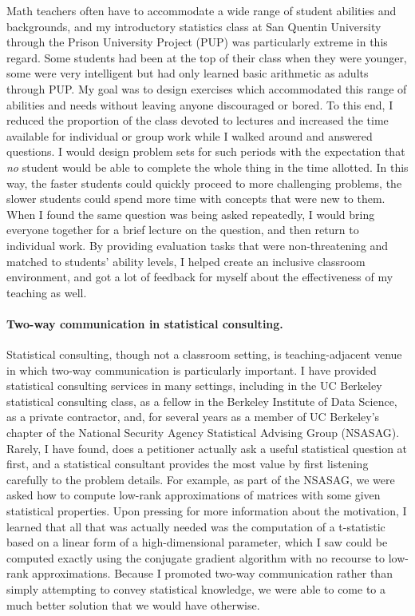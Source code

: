 Math teachers often have to accommodate a wide range of student abilities and
backgrounds, and my introductory statistics class at San Quentin University
through the Prison University Project (PUP) was particularly extreme in this
regard.  Some students had been at the top of their class when they were
younger, some were very intelligent but had only learned basic arithmetic as
adults through PUP.  My goal was to design exercises which accommodated this
range of abilities and needs without leaving anyone discouraged or bored. To
this end, I reduced the proportion of the class devoted to lectures and
increased the time available for individual or group work while I walked around
and answered questions.  I would design problem sets for such periods with the
expectation that \emph{no} student would be able to complete the whole thing in
the time allotted. In this way, the faster students could quickly proceed to
more challenging problems, the slower students could spend more time with
concepts that were new to them. When I found the same question was being asked
repeatedly, I would bring everyone together for a brief lecture on the question,
and then return to individual work.  By providing evaluation tasks that were
non-threatening and matched to students' ability levels, I helped create an
inclusive classroom environment, and got a lot of feedback for myself about the
effectiveness of my teaching as well.

\paragraph{Two-way communication in statistical consulting.}

Statistical consulting, though not a classroom setting, is teaching-adjacent
venue in which two-way communication is particularly important. I have provided
statistical consulting services in many settings, including in the UC Berkeley
statistical consulting class, as a fellow in the Berkeley Institute of Data
Science, as a private contractor, and, for several years as a member of UC
Berkeley's chapter of the National Security Agency Statistical Advising Group
(NSASAG).  Rarely, I have found, does a petitioner actually ask a useful
statistical question at first, and a statistical consultant provides the most
value by first listening carefully to the problem details.  For example, as part
of the NSASAG, we were asked how to compute low-rank approximations of matrices
with some given statistical properties.  Upon pressing for more information
about the motivation, I learned that all that was actually needed was the
computation of a t-statistic based on a linear form of a high-dimensional
parameter, which I saw could be computed exactly using the conjugate gradient
algorithm with no recourse to low-rank approximations.  Because I promoted
two-way communication rather than simply attempting to convey statistical
knowledge, we were able to come to a much better solution that we would have
otherwise.

